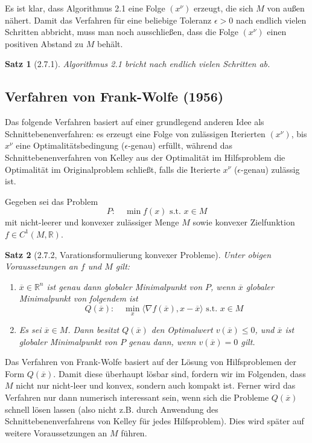 \documentclass[12pt]{extreport} %
\newcommand{\R}{\mathbb{R}}
\theoremstyle{named}
\theoremstyle{nnamed}
\theoremstyle{itshape}
\newtheorem*{satz}{Satz}
\theoremstyle{normal}
\begin{document}
Es ist klar, dass Algorithmus 2.1 eine Folge $(x^\nu)$ erzeugt, die sich $M$ von außen nähert. Damit das Verfahren für eine beliebige Toleranz $\epsilon > 0$ nach endlich vielen Schritten abbricht, muss man noch ausschließen, dass die Folge $(x^\nu)$ einen positiven Abstand zu $M$ behält.

\begin{satz}[2.7.1]
	Algorithmus 2.1 bricht nach endlich vielen Schritten ab.	
\end{satz}

\subsection*{Verfahren von Frank-Wolfe (1956)}

Das folgende Verfahren basiert auf einer grundlegend anderen Idee als Schnittebenenverfahren: es erzeugt eine Folge von zulässigen Iterierten $(x^\nu)$, bis $x^\nu$ eine Optimalitätsbedingung ($\epsilon$-genau) erfüllt, während das Schnittebenenverfahren von Kelley aus der Optimalität im Hilfsproblem die Optimalität im Originalproblem schließt, falls die Iterierte $x^\nu$ ($\epsilon$-genau) zulässig ist. ~\bigskip

Gegeben sei das Problem
	$$ P: \quad \min f(x) \text{ s.t. } x \in M $$
mit nicht-leerer und konvexer zulässiger Menge $M$ sowie konvexer Zielfunktion $f \in C^1(M, \R)$.

\begin{satz}[2.7.2, Varationsformulierung konvexer Probleme]
	Unter obigen Voraussetzungen an $f$ und $M$ gilt:
	\begin{enumerate}
		\item $\overline{x} \in \R^n$ ist genau dann globaler Minimalpunkt von $P$, wenn $\overline{x}$ globaler Minimalpunkt von folgendem ist
			$$ Q(\overline{x}): \quad \min_x \langle \nabla f(\overline{x}), x - \overline{x} \rangle \text{ s.t. } x \in M $$
		\item Es sei $\overline{x} \in M$. Dann besitzt $Q(\overline{x})$ den Optimalwert $v(\overline{x}) \leq 0$, und $\overline{x}$ ist globaler Minimalpunkt von $P$ genau dann, wenn $v(\overline{x}) = 0$ gilt.
	\end{enumerate}	
\end{satz}

Das Verfahren von Frank-Wolfe basiert auf der Lösung von Hilfsproblemen der Form $Q(\overline{x})$. Damit diese überhaupt lösbar sind, fordern wir im Folgenden, dass $M$ nicht nur nicht-leer und konvex, sondern auch kompakt ist. Ferner wird das Verfahren nur dann numerisch interessant sein, wenn sich die Probleme $Q(\overline{x})$ schnell lösen lassen (also nicht z.B. durch Anwendung des Schnittebenenverfahrens von Kelley für jedes Hilfsproblem). Dies wird später auf weitere Voraussetzungen an $M$ führen. ~\bigskip
\end{document}
